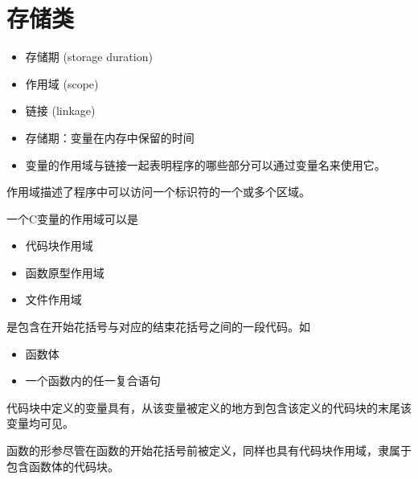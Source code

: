 \section{存储类}

\begin{frame}[fragile]\ft{\secname}
  \begin{itemize}
  \item 
    存储期{ (storage duration)}
  \item 
    作用域{ (scope)}
  \item 
    链接{ (linkage)}
  \end{itemize}
\end{frame}

\begin{frame}[fragile]\ft{}
  \begin{itemize}
  \item 存储期：变量在内存中保留的时间
  \item 变量的作用域与链接一起表明程序的哪些部分可以通过变量名来使用它。
  \end{itemize}
\end{frame}

\begin{frame}[fragile]
  作用域描述了程序中可以访问一个标识符的一个或多个区域。\vspace{0.1in}

  一个C变量的作用域可以是
  \begin{itemize}
  \item 代码块作用域
  \item 函数原型作用域
  \item 文件作用域
  \end{itemize}

\end{frame}

\begin{frame}[fragile]
  是包含在开始花括号与对应的结束花括号之间的一段代码。如
  \begin{itemize}
  \item 函数体
  \item 一个函数内的任一复合语句
  \end{itemize}
\end{frame}

\begin{frame}[fragile]

  代码块中定义的变量具有，从该变量被定义的地方到包含该定义的代码块的末尾该变量均可见。\vspace{0.1in}

  \begin{zhu}
    函数的形参尽管在函数的开始花括号前被定义，同样也具有代码块作用域，隶属于包含函数体的代码块。
  \end{zhu}

\end{frame}

